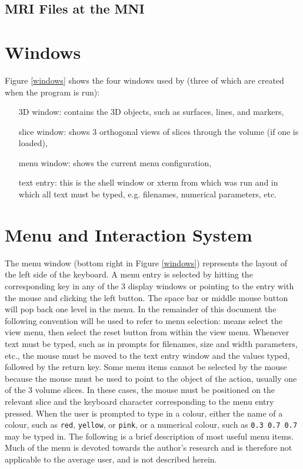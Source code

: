 \subsection{MRI Files at the MNI}

\section{\display Windows}


Figure \ref{windows} shows the four windows used by \display (three of which
are created when the program is run):

\begin{itemize}
\item[3D window:]  contains the 3D objects, such as surfaces, lines,
                  and markers,
\item[slice window:]  shows 3 orthogonal views of slices through the volume
                     (if one is loaded),
\item[menu window:]  shows the current menu configuration,
\item[text entry:]  this is the shell window or xterm from which \display was
                   run and in which all text must be typed, e.g. filenames,
                   numerical parameters, etc.
\end{itemize}

\section{Menu and Interaction System}

The menu window (bottom right in Figure \ref{windows}) represents the layout
of the left side of the keyboard.  A menu entry is selected by hitting the
corresponding key in any of the 3 display windows or pointing to the entry
with the mouse and clicking the left button.  The space bar or middle mouse
button will pop back one level in the menu.  In the remainder of this document
the following convention will be used to refer to menu selection:
 means select the view menu, then select the reset button
from within the view menu.  Whenever text must be typed, such as in prompts
for filenames, size and width parameters, etc., the mouse must be moved to the
text entry window and the values typed, followed by the return key.
Some menu items cannot be selected by the mouse because the mouse must be
used to point to the object of the action, usually one of the 3 volume slices.
In these cases, the mouse must be positioned on the relevant slice and the
keyboard character corresponding to the menu entry pressed.
When the user is prompted to type in a colour, either the name of a colour,
such as {\tt red}, {\tt yellow}, or {\tt pink}, or a numerical colour,
such as \mbox{\tt 0.3 0.7 0.7} may be typed in.  The following is a brief
description of most useful menu items.  Much of the menu is devoted towards
the author's research and is therefore not applicable to the average 
user, and is not described herein.

